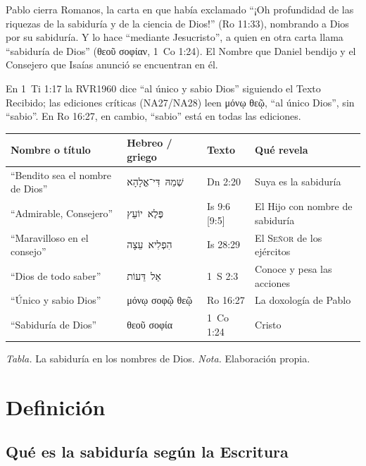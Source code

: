\documentclass[11pt,letterpaper]{article}
\newcommand{\heb}[1]{\mbox{\foreignlanguage{hebrew}{#1}}}
\newcommand{\grc}[1]{\foreignlanguage{ancientgreek}{#1}}
\newcommand{\SENOR}{\textsc{Señor}}
\begin{document}
Pablo cierra Romanos, la carta en que había exclamado ``¡Oh profundidad de las riquezas de la sabiduría y de la ciencia de Dios!'' (Ro 11:33), nombrando a Dios por su sabiduría. Y lo hace ``mediante Jesucristo'', a quien en otra carta llama ``sabiduría de Dios'' (\grc{θεοῦ σοφίαν}, 1~Co 1:24). El Nombre que Daniel bendijo y el Consejero que Isaías anunció se encuentran en él.

\begin{nota}
En 1~Ti 1:17 la RVR1960 dice ``al único y sabio Dios'' siguiendo el Texto Recibido; las ediciones críticas (NA27/NA28) leen \grc{μόνῳ θεῷ}, ``al único Dios'', sin ``sabio''. En Ro 16:27, en cambio, ``sabio'' está en todas las ediciones.
\end{nota}

\begin{center}
\small\renewcommand{\arraystretch}{1.2}
\begin{tabular}{@{}L{4.2cm}L{3.6cm}L{3.0cm}L{4.6cm}@{}}
\toprule
\textbf{Nombre o título} & \textbf{Hebreo / griego} & \textbf{Texto} & \textbf{Qué revela} \\ \midrule
``Bendito sea el nombre de Dios'' & \heb{שְׁמֵהּ דִּי־אֱלָהָא} & Dn 2:20 & Suya es la sabiduría \\
``Admirable, Consejero'' & \heb{פֶּלֶא יוֹעֵץ} & Is 9:6 [9:5] & El Hijo con nombre de sabiduría \\
``Maravilloso en el consejo'' & \heb{הִפְלִיא עֵצָה} & Is 28:29 & El \SENOR{} de los ejércitos \\
``Dios de todo saber'' & \heb{אֵל דֵּעוֹת} & 1~S 2:3 & Conoce y pesa las acciones \\
``Único y sabio Dios'' & \grc{μόνῳ σοφῷ θεῷ} & Ro 16:27 & La doxología de Pablo \\
``Sabiduría de Dios'' & \grc{θεοῦ σοφία} & 1~Co 1:24 & Cristo \\ \bottomrule
\end{tabular}\par\smallskip
{\footnotesize\color{gris}\textit{Tabla.} La sabiduría en los nombres de Dios. \textit{Nota.} Elaboración propia.}
\end{center}

\section{Definición}

\subsection{Qué es la sabiduría según la Escritura}
\end{document}

